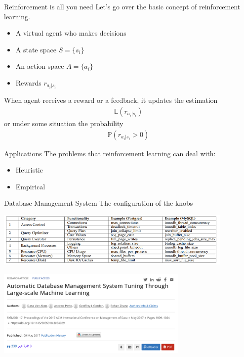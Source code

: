 \documentclass[UTF8]{beamer}
\begin{document}
\begin{frame}{Reinforcement is all you need}
  Let's go over the basic concept of reinforcement learning.
  \begin{itemize}
    \item <2-> A virtual agent who makes decisions
    \item <3-> A state space $S=\{s_i\}$
    \item <4-> An action space $A=\{a_i\}$
    \item <5-> Rewards $r_{a_i|s_i}$
  \end{itemize}
   {
    When agent receives a reward or a feedback, it updates the estimation \begin{align*}
      \mathbb{E} (r_{a_i|s_i})
    \end{align*}
    or under some situation the probability \begin{align*}
      \mathbb{P} (r_{a_i|s_i}>0)
    \end{align*}
  }
\end{frame}

\begin{frame}{Applications}
  The problems that reinforcement learning can deal with:
  \begin{itemize}
    \item Heuristic
    \item Empirical
  \end{itemize}
\end{frame}

\begin{frame}{Database Management System}
  The configuration of the knobs
  \begin{center}
    \includegraphics[height=75pt]{figure/dbms_knobs.png}
  \end{center}
  \begin{center}
    \includegraphics[height=120pt]{figure/auto_dbms.png}
  \end{center}
\end{frame}
\end{document}

